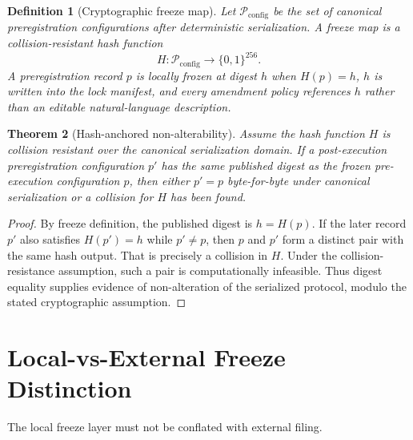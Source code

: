 \documentclass[11pt,a4paper]{article}
\newtheorem{theorem}{Theorem}[section]
\newtheorem{definition}[theorem]{Definition}
\begin{document}
\begin{definition}[Cryptographic freeze map]
Let $\mathcal{P}_{\mathrm{config}}$ be the set of canonical preregistration
configurations after deterministic serialization. A freeze map is a
collision-resistant hash function
\begin{equation}
H:\mathcal{P}_{\mathrm{config}}\to\{0,1\}^{256}.
\end{equation}
A preregistration record $p$ is locally frozen at digest $h$ when
$H(p)=h$, $h$ is written into the lock manifest, and every amendment policy
references $h$ rather than an editable natural-language description.
\end{definition}

\begin{theorem}[Hash-anchored non-alterability]
Assume the hash function $H$ is collision resistant over the canonical
serialization domain. If a post-execution preregistration configuration $p'$
has the same published digest as the frozen pre-execution configuration $p$,
then either $p'=p$ byte-for-byte under canonical serialization or a collision
for $H$ has been found.
\end{theorem}

\begin{proof}
By freeze definition, the published digest is $h=H(p)$. If the later record
$p'$ also satisfies $H(p')=h$ while $p'\neq p$, then $p$ and $p'$ form a distinct
pair with the same hash output. That is precisely a collision in $H$. Under the
collision-resistance assumption, such a pair is computationally infeasible.
Thus digest equality supplies evidence of non-alteration of the serialized
protocol, modulo the stated cryptographic assumption.
\end{proof}

\section{Local-vs-External Freeze Distinction}

The local freeze layer must not be conflated with external filing.
\end{document}
